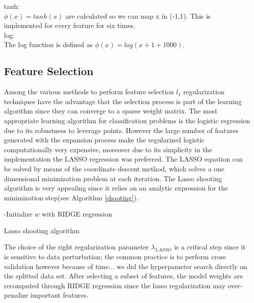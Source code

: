 \documentclass[letterpaper, 10 pt, conference]{ieeeconf}  %
\begin{document}
tanh:\\
  $\phi(x) = tanh(x)$ are calculated so we can map x in (-1,1). This is implemented for every feature for six times.\\
  
log:\\
The log function is defined as $\phi(x) =log(x + 1 + 1000)$.\\

\subsection{Feature Selection}
Among the various methods to perform feature selection $l_1$ regularization techniques have the advantage that the selection process is part of the learning algorithm since they can converge to a sparse weight matrix.
The most appropriate learning algorithm for classification problems is the logistic regression due to its robustness to leverage points. However the large number of features generated with the expansion process make the regularized logistic computationally very expensive, moreover due to its simplicity in the implementation the LASSO regression was preferred.
The LASSO equation can be solved by means of the coordinate descent method, which solves a one dimensional minimization problem at each iteration. The Lasso shooting algorithm is very appealing since it relies on an analytic expression for the minimization step(see Algorithm \ref{shooting}).   

\begin{algorithm}[]
 -Initialize $w$ with RIDGE regression \\
 \label{shooting}
 \caption{Lasso shooting algorithm}
\end{algorithm}

The choice of the right regularization parameter $\lambda_{LASSO}$ is a critical step since it is sensitive to data perturbation; the common practice is to perform cross validation however because of time... we did the hyperpameter search directly on the splitted data set. %
After selecting a subset of features, the model weights are recomputed through RIDGE regression since the lasso regularization may over-penalize important features.
\end{document}
